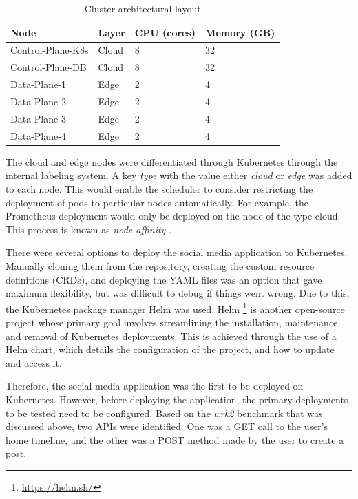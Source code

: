 \begin{table}
    \caption{Cluster architectural layout}\label{tab:cluster-hw-overview}
    \centering
    \begin{tabular}{|l|l|l|l|}
        \hline
        Node & Layer & CPU (cores) & Memory (GB)\\
        \hline
        Control-Plane-K8s & Cloud & 8 & 32\\
        Control-Plane-DB  & Cloud & 8 & 32\\
        Data-Plane-1      & Edge  & 2 & 4\\
        Data-Plane-2      & Edge  & 2 & 4\\
        Data-Plane-3      & Edge  & 2 & 4\\
        Data-Plane-4      & Edge  & 2 & 4\\
        \hline
    \end{tabular}
\end{table}

The cloud and edge nodes were differentiated through Kubernetes through the internal labeling system. A key \textit{type} with the value either \textit{cloud} or \textit{edge} was added to each node. This would enable the scheduler to consider restricting the deployment of pods to particular nodes automatically. For example, the Prometheus deployment would only be deployed on the node of the type cloud. This process is known as \textit{node affinity} \cite{santos2019towards}.\par

There were several options to deploy the social media application to Kubernetes. Manually cloning them from the repository, creating the custom resource definitions (CRDs), and deploying the YAML files was an option that gave maximum flexibility, but was difficult to debug if things went wrong. Due to this, the Kubernetes package manager Helm was used. Helm \footnote{\url{https://helm.sh/}} is another open-source project whose primary goal involves streamlining the installation, maintenance, and removal of Kubernetes deployments. This is achieved through the use of a Helm chart, which details the configuration of the project, and how to update and access it.\par

Therefore, the social media application was the first to be deployed on Kubernetes. However, before deploying the application, the primary deployments to be tested need to be configured. Based on the \textit{wrk2} benchmark that was discussed above, two APIs were identified. One was a GET call to the user's home timeline, and the other was a POST method made by the user to create a post.\par

